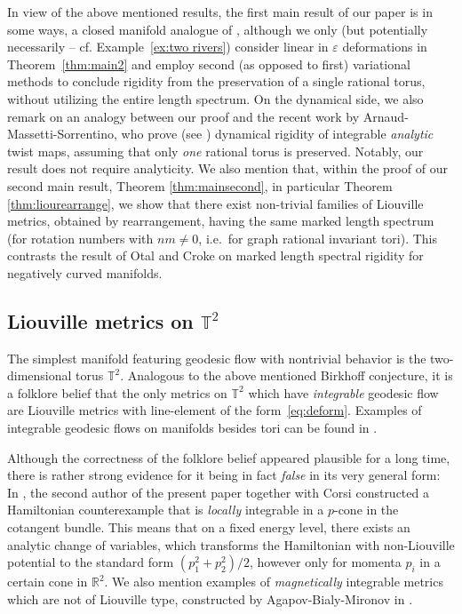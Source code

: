 \documentclass[11pt,letterpaper,oneside]{amsart}
\newcommand{\R}{\mathbb{R}}
\newcommand{\T}{\mathbb{T}}
\renewcommand{\epsilon}{\varepsilon}
\theoremstyle{definition}
\theoremstyle{remark}
\theoremstyle{definition}
\theoremstyle{remark}
\begin{document}
\medskip

In view of the above mentioned results, the first main result of our paper is in some ways, a closed manifold analogue of \cite{KaDSWe17}, although we only {(but potentially necessarily -- cf. Example~\ref{ex:two rivers})} consider linear in $\epsilon$ deformations in Theorem~\ref{thm:main2} and employ second (as opposed to first) variational methods to conclude rigidity from the preservation of a single rational torus, without utilizing the entire length spectrum. On the dynamical side, we also remark on an analogy between our proof and the recent work \cite{ArnaudMassettiSorrentino2023} by Arnaud-Massetti-Sorrentino, who prove (see \cite[Corollary~1.15]{ArnaudMassettiSorrentino2023}) dynamical rigidity of integrable \emph{analytic} twist maps, assuming that only \emph{one} rational torus is preserved. Notably, our result does not require analyticity. We also mention that, within the proof of our second main result, Theorem \ref{thm:mainsecond}, in particular Theorem \ref{thm:liourearrange}, we show that there exist non-trivial families of Liouville metrics, obtained by rearrangement, having the same marked length spectrum (for rotation numbers with $nm \neq 0$, i.e.~for graph rational invariant tori). This contrasts the result of Otal \cite{otal1990spectre} and Croke \cite{croke1990rigidity} on marked length spectral rigidity for negatively curved manifolds.


\subsection{Liouville metrics on $\T^2$}
The simplest manifold featuring geodesic flow with nontrivial behavior is the two-dimensional torus $\T^2$. Analogous to the above mentioned Birkhoff conjecture, it is a folklore belief that the only metrics on $\T^2$ which have \emph{integrable} geodesic flow are Liouville metrics with line-element of the form~\eqref{eq:deform}. Examples of integrable geodesic flows on manifolds besides tori can be found in \cite{PaternainSpatzier1990}.

\medskip

Although the correctness of the folklore belief appeared plausible for a long time, there is rather strong evidence for it being in fact \emph{false} in its very general form: In \cite{CorsiKaloshin2018}, the second author of the present paper together with Corsi constructed a Hamiltonian counterexample that is \emph{locally} integrable in a $p$-cone in the cotangent bundle. This means that on a fixed energy level, there exists an analytic change of variables, which transforms the Hamiltonian with non-Liouville potential to the standard form $(p_1^2 + p_2^2)/2$, however only for momenta $p_i$ in a certain cone in $\R^2$. We also mention examples of \emph{magnetically} integrable metrics which are not of Liouville type, constructed by Agapov-Bialy-Mironov in \cite{ABM}. 
\end{document}

